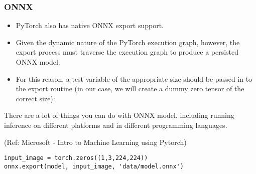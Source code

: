 \begin{frame}[fragile] \frametitle{ONNX}

\begin{itemize}
\item PyTorch also has native ONNX export support. 
\item Given the dynamic nature of the PyTorch execution graph, however, the export process must traverse the execution graph to produce a persisted ONNX model. 
\item For this reason, a test variable of the appropriate size should be passed in to the export routine (in our case, we will create a dummy zero tensor of the correct size):
\end{itemize}

There are a lot of things you can do with ONNX model, including running inference on different platforms and in different programming languages. 

\tiny{(Ref: Microsoft - Intro to Machine Learning using Pytorch)}

\begin{lstlisting}
input_image = torch.zeros((1,3,224,224))
onnx.export(model, input_image, 'data/model.onnx')
\end{lstlisting}


\end{frame}








